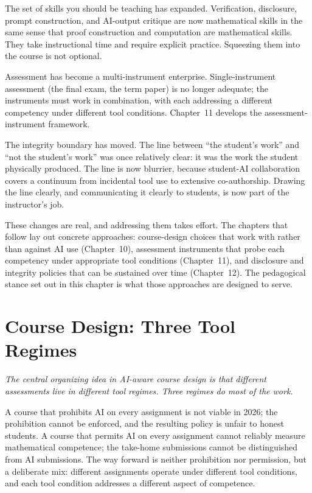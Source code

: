 \documentclass[11pt]{book}
\begin{document}
The set of skills you should be teaching has expanded. Verification, disclosure, prompt construction, and AI-output critique are now mathematical skills in the same sense that proof construction and computation are mathematical skills. They take instructional time and require explicit practice. Squeezing them into the course is not optional.

Assessment has become a multi-instrument enterprise. Single-instrument assessment (the final exam, the term paper) is no longer adequate; the instruments must work in combination, with each addressing a different competency under different tool conditions. Chapter~11 develops the assessment-instrument framework.

The integrity boundary has moved. The line between ``the student's work'' and ``not the student's work'' was once relatively clear: it was the work the student physically produced. The line is now blurrier, because student-AI collaboration covers a continuum from incidental tool use to extensive co-authorship. Drawing the line clearly, and communicating it clearly to students, is now part of the instructor's job.

These changes are real, and addressing them takes effort. The chapters that follow lay out concrete approaches: course-design choices that work with rather than against AI use (Chapter~10), assessment instruments that probe each competency under appropriate tool conditions (Chapter~11), and disclosure and integrity policies that can be sustained over time (Chapter~12). The pedagogical stance set out in this chapter is what those approaches are designed to serve.

\chapter{Course Design: Three Tool Regimes}
\label{ch:three-regimes}

\noindent \emph{The central organizing idea in AI-aware course design is that different assessments live in different tool regimes. Three regimes do most of the work.}

\medskip

A course that prohibits AI on every assignment is not viable in 2026; the prohibition cannot be enforced, and the resulting policy is unfair to honest students. A course that permits AI on every assignment cannot reliably measure mathematical competence; the take-home submissions cannot be distinguished from AI submissions. The way forward is neither prohibition nor permission, but a deliberate mix: different assignments operate under different tool conditions, and each tool condition addresses a different aspect of competence.
\end{document}
